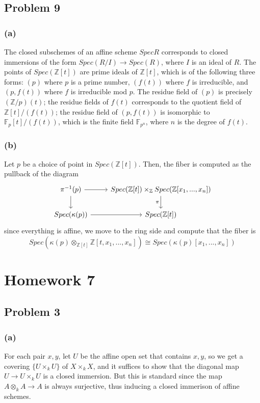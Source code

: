 \documentclass{article}
\theoremstyle{definition}
\theoremstyle{definition}
\theoremstyle{definition}
\theoremstyle{definition}
\theoremstyle{definition}
\theoremstyle{definition}
\theoremstyle{definition}
\begin{document}
\subsection*{Problem 9}

\subsubsection*{(a)}
The closed subschemes of an affine scheme $Spec R$ corresponds to closed immersions of the form $Spec(R/I)\to Spec(R)$, where $I$ is an ideal of $R$. The points of $Spec(\mathbb{Z}[t])$ are prime ideals of $\mathbb{Z}[t]$, which is of the following three forms: $(p)$ where $p$ is a prime number, $(f(t))$ where $f$ is irreducible, and $(p,f(t))$ where $f$ is irreducible mod $p$. The residue field of $(p)$ is precisely $(\mathbb{Z}/p)(t)$; the residue fields of $f(t)$ corresponds to the quotient field of $\mathbb{Z}[t]/(f(t))$; the residue field of $(p,f(t))$ is isomorphic to $\mathbb{F}_p[t]/(f(t))$, which is the finite field $\mathbb{F}_{p^n}$, where $n$ is the degree of $f(t)$.
\subsubsection*{(b)}
Let $p$ be a choice of point in $Spec(\mathbb{Z}[t])$. Then, the fiber is computed as the pullback of the diagram
\[\begin{tikzcd}
	{\pi^{-1}(p)} & {Spec(\mathbb{Z}[t])\times_{\mathbb{Z}}Spec(\mathbb{Z}[x_1,...,x_n])} \\
	{Spec(\kappa(p))} & {Spec(\mathbb{Z}[t])}
	\arrow[from=1-1, to=1-2]
	\arrow[from=1-1, to=2-1]
	\arrow["\pi"', from=1-2, to=2-2]
	\arrow[from=2-1, to=2-2]
\end{tikzcd}\]
since everything is affine, we move to the ring side and compute that the fiber is 
\[Spec(\kappa(p)\otimes_{\mathbb{Z}[t]}\mathbb{Z}[t,x_1,...,x_n])\cong Spec(\kappa(p)[x_1,...,x_n])\]

\section*{Homework 7}

\subsection*{Problem 3}
\subsubsection*{(a)}
For each pair $x,y$, let $U$ be the affine open set that contains $x,y$, so we get a covering $\{U\times_k U\}$ of $X\times_k X$, and it suffices to show that the diagonal map $U\to U\times_k U$ is a closed immersion. But this is standard since the map $A\otimes_k A\to A $ is always surjective, thus inducing a closed immerison of affine schemes. 
\end{document}
